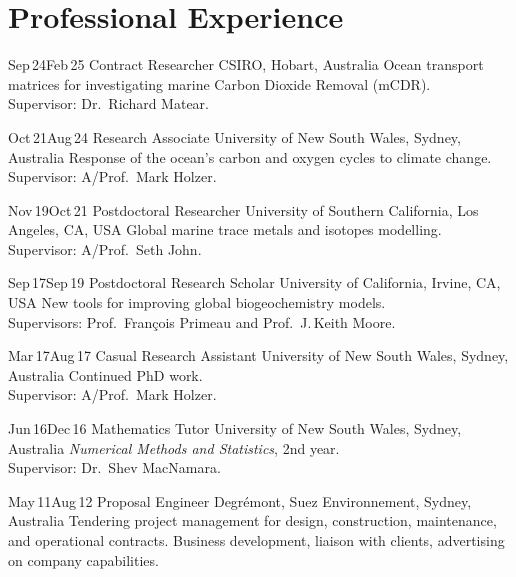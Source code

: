 
\section{Professional Experience}
\begin{entrylist}
  \entry
    {Sep\,24\textemdash{}Feb\,25}
    {Contract Researcher}
    {CSIRO, Hobart, Australia}
    {Ocean transport matrices for investigating marine Carbon Dioxide Removal (mCDR).\\
    Supervisor: Dr.~Richard Matear.}


  \entry
    {Oct\,21\textemdash{}Aug\,24}
    {Research Associate}
    {University of New South Wales, Sydney, Australia}
    {Response of the ocean's carbon and oxygen cycles to climate change.\\
    Supervisor: A/Prof.~Mark Holzer.}

  \entry
    {Nov\,19\textemdash{}Oct\,21}
    {Postdoctoral Researcher}
    {University of Southern California, Los Angeles, CA, USA}
    {Global marine trace metals and isotopes modelling.\\
    Supervisor: A/Prof.~Seth John.}

  \entry
    {Sep\,17\textemdash{}Sep\,19}
    {Postdoctoral Research Scholar}
    {University of California, Irvine, CA, USA}
    {New tools for improving global biogeochemistry models.\\
    Supervisors: Prof.~Fran\c{c}ois Primeau and Prof.~J.\,Keith Moore.}

  \entry
    {Mar\,17\textemdash{}Aug\,17}
    {Casual Research Assistant}
    {University of New South Wales, Sydney, Australia}
    {Continued PhD work.\\
    Supervisor: A/Prof.~Mark Holzer.}

  \entry
    {Jun\,16\textemdash{}Dec\,16}
    {Mathematics Tutor}
    {University of New South Wales, Sydney, Australia}
    {\emph{Numerical Methods and Statistics}, 2nd year.\\
    Supervisor: Dr.~Shev MacNamara.}

  \entry
    {May\,11\textemdash{}Aug\,12}
    {Proposal Engineer}
    {Degr\'{e}mont, Suez Environnement, Sydney, Australia}
    {Tendering project management for design, construction, maintenance, and operational contracts.
    Business development, liaison with clients, advertising on company capabilities.}


\end{entrylist}
